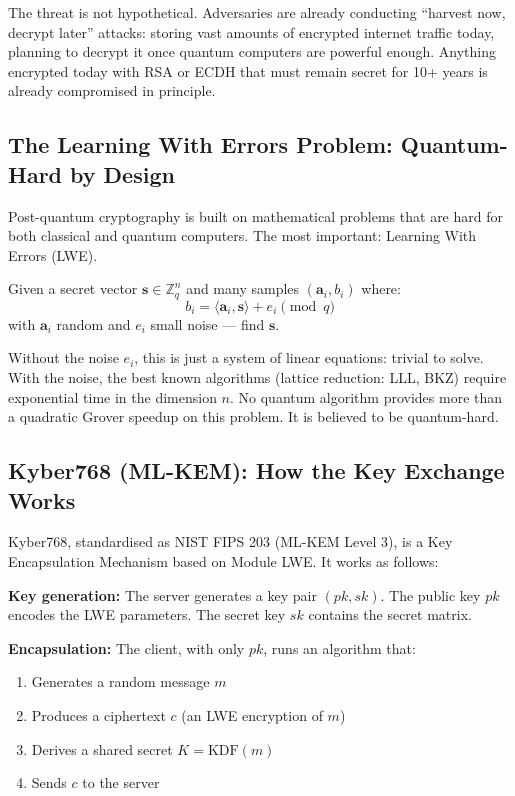 \documentclass[11pt,a4paper]{article}
\begin{document}
The threat is not hypothetical. Adversaries are already conducting ``harvest now, decrypt later'' attacks: storing vast amounts of encrypted internet traffic today, planning to decrypt it once quantum computers are powerful enough. Anything encrypted today with RSA or ECDH that must remain secret for 10+ years is already compromised in principle.

\subsection{The Learning With Errors Problem: Quantum-Hard by Design}

Post-quantum cryptography is built on mathematical problems that are hard for both classical and quantum computers. The most important: Learning With Errors (LWE).

Given a secret vector $\mathbf{s} \in \mathbb{Z}_q^n$ and many samples $(\mathbf{a}_i, b_i)$ where:
\[
b_i = \langle \mathbf{a}_i, \mathbf{s} \rangle + e_i \pmod{q}
\]
with $\mathbf{a}_i$ random and $e_i$ small noise — find $\mathbf{s}$.

Without the noise $e_i$, this is just a system of linear equations: trivial to solve. With the noise, the best known algorithms (lattice reduction: LLL, BKZ) require exponential time in the dimension $n$. No quantum algorithm provides more than a quadratic Grover speedup on this problem. It is believed to be quantum-hard.

\subsection{Kyber768 (ML-KEM): How the Key Exchange Works}

Kyber768, standardised as NIST FIPS 203 (ML-KEM Level 3), is a Key Encapsulation Mechanism based on Module LWE. It works as follows:

\textbf{Key generation:} The server generates a key pair $(pk, sk)$. The public key $pk$ encodes the LWE parameters. The secret key $sk$ contains the secret matrix.

\textbf{Encapsulation:} The client, with only $pk$, runs an algorithm that:
\begin{enumerate}
  \item Generates a random message $m$
  \item Produces a ciphertext $c$ (an LWE encryption of $m$)
  \item Derives a shared secret $K = \text{KDF}(m)$
  \item Sends $c$ to the server
\end{enumerate}
\end{document}
